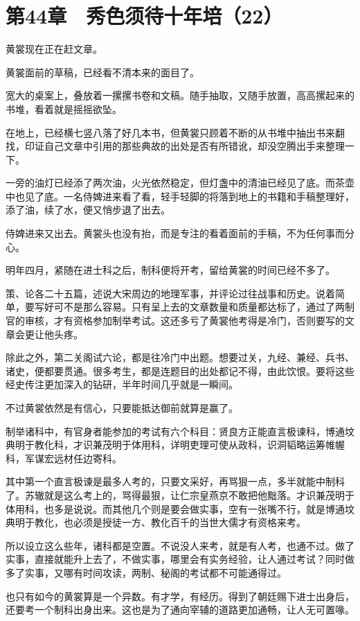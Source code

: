 \section{第44章　秀色须待十年培（22）}

黄裳现在正在赶文章。

黄裳面前的草稿，已经看不清本来的面目了。

宽大的桌案上，叠放着一摞摞书卷和文稿。随手抽取，又随手放置，高高摞起来的书堆，看着就是摇摇欲坠。

在地上，已经横七竖八落了好几本书，但黄裳只顾着不断的从书堆中抽出书来翻找，印证自己文章中引用的那些典故的出处是否有所错讹，却没空腾出手来整理一下。

一旁的油灯已经添了两次油，火光依然稳定，但灯盏中的清油已经见了底。而茶壶中也见了底。一名侍婢进来看了看，轻手轻脚的将落到地上的书籍和手稿整理好，添了油，续了水，便又悄步退了出去。

侍婢进来又出去。黄裳头也没有抬，而是专注的看着面前的手稿，不为任何事而分心。

明年四月，紧随在进士科之后，制科便将开考，留给黄裳的时间已经不多了。

策、论各二十五篇，述说大宋周边的地理军事，并评论过往战事和历史。说着简单，要写好可不是那么容易。只有呈上去的文章数量和质量都达标了，通过了两制官的审核，才有资格参加制举考试。这还多亏了黄裳他考得是冷门，否则要写的文章会更让他头疼。

除此之外，第二关阁试六论，都是往冷门中出题。想要过关，九经、兼经、兵书、诸史，便都要贯通。很多考生，都是连题目的出处都记不得，由此饮恨。要将这些经史传注更加深入的钻研，半年时间几乎就是一瞬间。

不过黄裳依然是有信心，只要能抵达御前就算是赢了。

制举诸科中，有官身者能参加的考试有六个科目：贤良方正能直言极谏科，博通坟典明于教化科，才识兼茂明于体用科，详明吏理可使从政科，识洞韬略运筹帷幄科，军谋宏远材任边寄科。

其中第一个直言极谏是最多人考的，只要文采好，再骂狠一点，多半就能中制科了。苏辙就是这么考上的，骂得最狠，让仁宗皇燕京不敢把他黜落。才识兼茂明于体用科，也多是说说。而其他几个则是要会做实事，空有一张嘴不行，就是博通坟典明于教化，也必须是授徒一方、教化百千的当世大儒才有资格来考。

所以设立这么些年，诸科都是空置。不说没人来考，就是有人考，也通不过。做了实事，直接就能升上去了，不做实事，哪里会有实务经验，让人通过考试？同时做多了实事，又哪有时间攻读，两制、秘阁的考试都不可能通得过。

也只有如今的黄裳算是一个异数。有才学，有经历。得到了朝廷赐下进士出身后，还要考一个制科出身出来。这也是为了通向宰辅的道路更加通畅，让人无可置喙。

